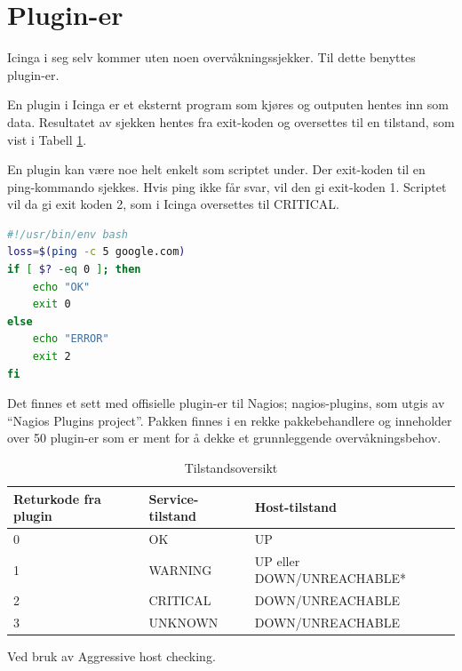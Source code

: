 \section{Plugin-er}
Icinga i seg selv kommer uten noen overvåkningssjekker. Til dette benyttes plugin-er.

En plugin i Icinga er et eksternt program som kjøres og outputen hentes inn som data. Resultatet av sjekken hentes fra exit-koden\cite{wiki:returncode} og oversettes til en tilstand, som vist i Tabell \ref{state}.

En plugin kan være noe helt enkelt som scriptet under. Der exit-koden til en ping-kommando sjekkes. Hvis ping ikke får svar, vil den gi exit-koden 1. Scriptet vil da gi exit koden 2, som i Icinga oversettes til CRITICAL.
\begin{lstlisting}[language=bash]
#!/usr/bin/env bash
loss=$(ping -c 5 google.com)
if [ $? -eq 0 ]; then
    echo "OK"
    exit 0
else
    echo "ERROR"
    exit 2
fi
\end{lstlisting}

Det finnes et sett med offisielle plugin-er til Nagios; nagios-plugins, som utgis av ``Nagios Plugins project''. Pakken finnes i en rekke pakkebehandlere og inneholder over 50 plugin-er som er ment for å dekke et grunnleggende overvåkningsbehov\cite{nagiosplugins}.

\begin{table}[H]
	\begin{center}
	\begin{threeparttable}
	\begin{tabular}{| l | l | l |} \hline
	\textbf{Returkode fra plugin} & \textbf{Service-tilstand} & \textbf{Host-tilstand} \\ \hline
	0 & OK & UP \\ \hline
	1 & WARNING & UP eller DOWN/UNREACHABLE* \\ \hline
	2 & CRITICAL & DOWN/UNREACHABLE \\ \hline
	3 & UNKNOWN & DOWN/UNREACHABLE \\ \hline
	\end{tabular}
	\begin{tablenotes}
	\small
	\item *Ved bruk av Aggressive host checking\cite{icingapluginapi}.
	\end{tablenotes}
	\caption{Tilstandsoversikt}
	\label{state}
	\end{threeparttable}
	\end{center}
\end{table}


